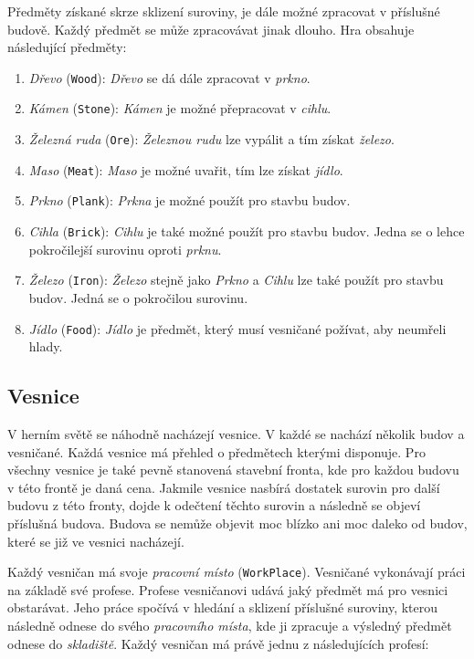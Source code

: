 Předměty získané skrze sklizení suroviny, je dále možné zpracovat v příslušné budově. Každý předmět se může zpracovávat jinak dlouho. Hra obsahuje následující předměty:

\begin{enumerate}
    \item \textit{Dřevo} (\verb|Wood|): \textit{Dřevo} se dá dále zpracovat v \textit{prkno}.
    \item \textit{Kámen} (\verb|Stone|): \textit{Kámen} je možné přepracovat v \textit{cihlu}.
    \item \textit{Železná ruda} (\verb|Ore|): \textit{Železnou rudu} lze vypálit a tím získat \textit{železo}.
    \item \textit{Maso} (\verb|Meat|): \textit{Maso} je možné uvařit, tím lze získat \textit{jídlo}.
    \item \textit{Prkno} (\verb|Plank|): \textit{Prkna} je možné použít pro stavbu budov.
    \item \textit{Cihla} (\verb|Brick|): \textit{Cihlu} je také možné použít pro stavbu budov. Jedna se o lehce pokročilejší surovinu oproti \textit{prknu}.
    \item \textit{Železo} (\verb|Iron|): \textit{Železo} stejně jako \textit{Prkno} a \textit{Cihlu} lze také použít pro stavbu budov. Jedná se o pokročilou surovinu.
    \item \textit{Jídlo} (\verb|Food|): \textit{Jídlo} je předmět, který musí vesničané požívat, aby neumřeli hlady.
\end{enumerate}

\subsection{Vesnice}
\label{subsec:villages}
V herním světě se náhodně nacházejí vesnice. V každé se nachází několik budov a vesničané. Každá vesnice má přehled o předmětech kterými disponuje. Pro všechny vesnice je také pevně stanovená stavební fronta, kde pro každou budovu v této frontě je daná cena. Jakmile vesnice nasbírá dostatek surovin pro další budovu z této fronty, dojde k odečtení těchto surovin a následně se objeví příslušná budova. Budova se nemůže objevit moc blízko ani moc daleko od budov, které se již ve vesnici nacházejí.

Každý vesničan má svoje \textit{pracovní místo} (\verb|WorkPlace|). Vesničané vykonávají práci na základě své profese. Profese vesničanovi udává jaký předmět má pro vesnici obstarávat. Jeho práce spočívá v hledání a sklizení příslušné suroviny, kterou následně odnese do svého \textit{pracovního místa}, kde ji zpracuje a výsledný předmět odnese do \textit{skladiště}. Každý vesničan má právě jednu z následujících profesí:

